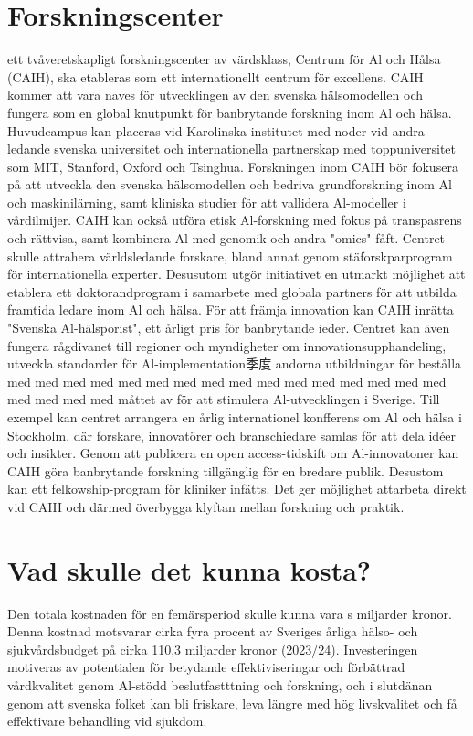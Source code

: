 {{{{{{{{{{{{{\section*{Forskningscenter}
ett tvåveretskapligt forskningscenter av värdsklass, Centrum för Al och Hålsa (CAIH), ska etableras som ett internationellt centrum för excellens. CAIH kommer att vara naves för utvecklingen av den svenska hälsomodellen och fungera som en global knutpunkt för banbrytande forskning inom Al och hälsa. Huvudcampus kan placeras vid Karolinska institutet med noder vid andra ledande svenska universitet och internationella partnerskap med toppuniversitet som MIT, Stanford, Oxford och Tsinghua.
Forskningen inom CAIH bör fokusera på att utveckla den svenska hälsomodellen och bedriva grundforskning inom Al och maskinilärning, samt kliniska studier för att vallidera Al-modeller i vårdilmijer. CAIH kan också utföra etisk Al-forskning med fokus på transpasrens och rättvisa, samt kombinera Al med genomik och andra "omics" fåft.
Centret skulle attrahera världsledande forskare, bland annat genom stäforskparprogram för internationella experter. Desusutom utgör initiativet en utmarkt möjlighet att etablera ett doktorandprogram i samarbete med globala partners för att utbilda framtida ledare inom Al och hälsa. För att främja innovation kan CAIH inrätta "Svenska Al-hälsporist", ett årligt pris för banbrytande ieder. Centret kan även fungera rågdivanet till regioner och myndigheter om innovationsupphandeling, utveckla standarder för Al-implementation季度 andorna utbildningar för bestålla med med med med med med med med med med med med med med med med med med med med måttet av för att stimulera Al-utvecklingen i Sverige. Till exempel kan centret arrangera en årlig internationel konfferens om Al och hälsa i Stockholm, där forskare, innovatörer och branschiedare samlas för att dela idéer och insikter. Genom att publicera en open access-tidskift om Al-innovatoner kan CAIH göra banbrytande forskning tillgänglig för en bredare publik. Desustom kan ett felkowship-program för kliniker infätts. Det ger möjlighet attarbeta direkt vid CAIH och därmed överbygga klyftan mellan forskning och praktik.
\section*{Vad skulle det kunna kosta?}
Den totala kostnaden för en femärsperiod skulle kunna vara s miljarder kronor.
Denna kostnad motsvarar cirka fyra procent av Sveriges årliga hälso- och sjukvårdsbudget på cirka 110,3 miljarder kronor (2023/24). Investeringen motiveras av potentialen för betydande effektiviseringar och förbättrad vårdkvalitet genom Al-stödd beslutfastttning och forskning, och i slutdänan genom att svenska folket kan bli friskare, leva längre med hög livskvalitet och få effektivare behandling vid sjukdom.
}}}}}}}}}}}}}
